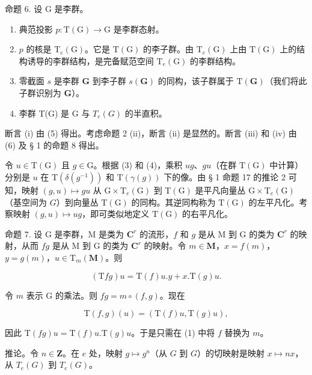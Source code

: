 命题 6. 设 G 是李群。

\begin{enumerate}
\def\labelenumi{(\roman{enumi})}
\item
  典范投影 \(p: \mathrm{T}(\mathrm{G}) \to \mathrm{G}\) 是李群态射。
\item
  \(p\) 的核是 \(\mathrm{T}_e(\mathrm{G})\)。它是 \(\mathrm{T}(\mathrm{G})\) 的李子群。由 \(\mathrm{T}_e(\mathrm{G})\) 上由 \(\mathrm{T}(\mathrm{G})\) 上的结构诱导的李群结构，是完备赋范空间 \(\mathrm{T}_e(\mathrm{G})\) 的李群结构。
\item
  零截面 \(s\) 是李群 \(\mathbf{G}\) 到李子群 \(s(\mathbf{G})\) 的同构，该子群属于 \(\mathrm{T}(\mathbf{G})\)（我们将此子群识别为 \(\mathbf{G}\)）。
\item
  李群 T(G) 是 G 与 \(T_{e}(G)\) 的半直积。
\end{enumerate}

断言 (i) 由 (5) 得出。考虑命题 2 (ii)，断言 (ii) 是显然的。断言 (iii) 和 (iv) 由 (6) 及 § 1 的命题 8 得出。

令 \(u \in \mathrm{T}(\mathrm{G})\) 且 \(g \in \mathrm{G}\)。根据 (3) 和 (4)，乘积 \(ug\)、\(gu\)（在群 \(\mathrm{T}(\mathrm{G})\) 中计算）分别是 \(u\) 在 \(\mathrm{T}(\delta(g^{-1}))\) 和 \(\mathrm{T}(\gamma(g))\) 下的像。由 § 1 命题 17 的推论 2 可知，映射 \((g, u) \mapsto gu\) 从 \(\mathrm{G} \times \mathrm{T}_e(\mathrm{G})\) 到 \(\mathrm{T}(\mathrm{G})\) 是平凡向量丛 \(\mathrm{G} \times \mathrm{T}_e(\mathrm{G})\)（基空间为 \(G\)）到向量丛 \(\mathrm{T}(\mathrm{G})\) 的同构。其逆同构称为 \(\mathrm{T}(\mathrm{G})\) 的左平凡化。考察映射 \((g, u) \mapsto ug\)，即可类似地定义 \(\mathrm{T}(\mathrm{G})\) 的右平凡化。

命题 7. 设 G 是李群，M 是类为 \(\mathbf{C}^r\) 的流形，\(f\) 和 \(g\) 是从 M 到 G 的类为 \(\mathbf{C}^r\) 的映射，从而 \(fg\) 是从 M 到 G 的类为 \(\mathbf{C}^r\) 的映射。令 \(m \in \mathbf{M}\)，\(x = f(m)\)，\(y = g(m)\)，\(u \in \mathrm{T}_m(\mathbf{M})\)。则

\[
(\mathrm{T} f g) u = \mathrm{T} (f) u. y + x. \mathrm{T} (g) u.
\]

令 \(m\) 表示 G 的乘法。则 \(fg = m \circ (f, g)\)。现在

\[
\mathrm{T} (f, g) (u) = (\mathrm{T} (f) u, \mathrm{T} (g) u),
\]

因此 \(\mathrm{T}(fg)u = \mathrm{T}(f)u.\mathrm{T}(g)u\)。于是只需在 (1) 中将 \(f\) 替换为 \(m\)。

推论。令 \(n \in \mathbf{Z}\)。在 \(e\) 处，映射 \(g \mapsto g^n\)（从 \(G\) 到 \(G\)）的切映射是映射 \(x \mapsto nx\)，从 \(T_e(G)\) 到 \(T_e(G)\)。

